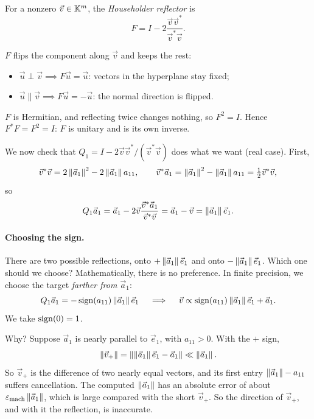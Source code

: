 \begin{definition}
  For a nonzero $\vec{v} \in \mathbb{K}^m$, the \emph{Householder reflector} is
  \begin{equation}
    F = I - 2\frac{\vec{v}\vec{v}^\ast}{\vec{v}^\ast\vec{v}}.
  \end{equation}
\end{definition}

$F$ flips the component along $\vec{v}$ and keeps the rest:
\begin{itemize}
  \item $\vec{u} \perp \vec{v} \implies F\vec{u} = \vec{u}$: vectors in the hyperplane stay fixed;
  \item $\vec{u} \parallel \vec{v} \implies F\vec{u} = -\vec{u}$: the normal direction is flipped.
\end{itemize}
$F$ is Hermitian, and reflecting twice changes nothing, so $F^2 = I$. Hence $F^\ast F = F^2 = I$: $F$ is unitary and is its own inverse.

\pagebreak
We now check that $Q_1 = I - 2\vec{v}\vec{v}^\ast/(\vec{v}^\ast\vec{v})$ does what we want (real case). First,
\begin{equation}
  \vec{v}^\ast\vec{v} = 2\left\lVert \vec{a}_1 \right\rVert^2 - 2\left\lVert \vec{a}_1 \right\rVert a_{11}, \qquad \vec{v}^\ast\vec{a}_1 = \left\lVert \vec{a}_1 \right\rVert^2 - \left\lVert \vec{a}_1 \right\rVert a_{11} = \tfrac{1}{2}\vec{v}^\ast\vec{v},
\end{equation}
so
\begin{equation}
  Q_1\vec{a}_1 = \vec{a}_1 - 2\vec{v}\frac{\vec{v}^\ast\vec{a}_1}{\vec{v}^\ast\vec{v}} = \vec{a}_1 - \vec{v} = \left\lVert \vec{a}_1 \right\rVert\vec{e}_1.
\end{equation}

\paragraph{Choosing the sign.} There are two possible reflections, onto $+\left\lVert \vec{a}_1 \right\rVert\vec{e}_1$ and onto $-\left\lVert \vec{a}_1 \right\rVert\vec{e}_1$. Which one should we choose? Mathematically, there is no preference. In finite precision, we choose the target \emph{farther from $\vec{a}_1$}:
\begin{equation}
  Q_1\vec{a}_1 = -\operatorname{sign}(a_{11})\left\lVert \vec{a}_1 \right\rVert\vec{e}_1 \quad\implies\quad \vec{v} \propto \operatorname{sign}(a_{11})\left\lVert \vec{a}_1 \right\rVert\vec{e}_1 + \vec{a}_1.
\end{equation}
We take $\operatorname{sign}(0) = 1$.

Why? Suppose $\vec{a}_1$ is nearly parallel to $\vec{e}_1$, with $a_{11} > 0$. With the $+$ sign,
\begin{equation}
  \left\lVert \vec{v}_+ \right\rVert = \left\lVert \left\lVert \vec{a}_1 \right\rVert\vec{e}_1 - \vec{a}_1 \right\rVert \ll \left\lVert \vec{a}_1 \right\rVert.
\end{equation}
So $\vec{v}_+$ is the difference of two nearly equal vectors, and its first entry $\left\lVert \vec{a}_1 \right\rVert - a_{11}$ suffers cancellation. The computed $\left\lVert \vec{a}_1 \right\rVert$ has an absolute error of about $\varepsilon_{\mathrm{mach}}\left\lVert \vec{a}_1 \right\rVert$, which is large compared with the short $\vec{v}_+$. So the direction of $\vec{v}_+$, and with it the reflection, is inaccurate.

